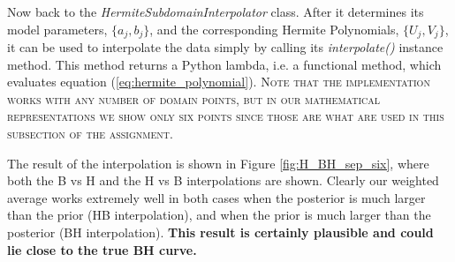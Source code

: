 \documentclass[11pt]{article}
\begin{document}
Now back to the \textit{HermiteSubdomainInterpolator} class. After it determines its model parameters, $\{a_j, b_j\}$, and the corresponding Hermite Polynomials, $\{U_j, V_j\}$, it can be used to interpolate the data simply by calling its \textit{interpolate()} instance method. This method returns a Python lambda, i.e. a functional method, which evaluates equation (\ref{eq:hermite_polynomial}).
\textsc{\footnotesize *Note that the implementation works with any number of domain points, but in our mathematical representations we show only six points since those are what are used in this subsection of the assignment.}

The result of the interpolation is shown in Figure \ref{fig:H_BH_sep_six}, where both the B vs H and the H vs B interpolations are shown. Clearly our weighted average works extremely well in both cases when the posterior is much larger than the prior (HB interpolation), and when the prior is much larger than the posterior (BH interpolation). \textbf{This result is certainly plausible and could lie close to the true BH curve.}
\end{document}
